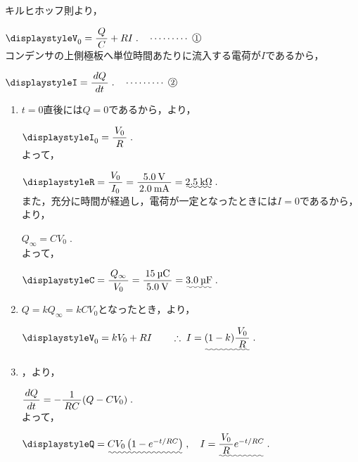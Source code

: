 \documentclass[../../../uem_phy_std_a.tex]{subfiles}
\begin{document}
    キルヒホッフ則より，
    
    \myspaceb%
    $\displaystyle%
        V_0 = \myfracc{Q}{C} + RI \;.\quad\cdots\cdots\cdots\;\mynumberb{1}
    $\\
    コンデンサの上側極板へ単位時間あたりに流入する電荷が$I$であるから，
    
    \myspaceb%
    $\displaystyle%
        I = \myfracc{dQ}{dt} \;.\quad\cdots\cdots\cdots\;\mynumberb{2}
    $
    
    \begin{enumerate}
        \item $t=0$直後には$Q=0$であるから，より，
            
            \myspaceb%
            $\displaystyle%
                I_0 = \myfracc{V_0}{R} \;.
            $\\
            よって，
            
            \myspaceb%
            $\displaystyle%
                R = \myfracc{V_0}{I_0}%
                = \myfraca{5.0\:\mathrm{V}}{2.0\:\mathrm{mA}}%
                = \uwave{2.5\:\mathrm{k}\Omega} \;.
            $\\
            また，充分に時間が経過し，電荷が一定となったときには$I=0$であるから，より，
            
            \myspaceb%
            $\displaystyle%
                Q_\infty = CV_0 \;.
            $\\
            よって，
            
            \myspaceb%
            $\displaystyle%
                C = \myfracc{Q_\infty}{V_0}%
                = \myfracc{15\:\text{\textmu C}}{5.0\:\mathrm{V}}%
                = \uwave{3.0\:\text{\textmu F}} \;.
            $
        \item $Q = kQ_\infty = kCV_0$となったとき，より，
            
            \myspaceb%
            $\displaystyle%
                V_0 = kV_0 + RI%
                \qquad \therefore \; I = \uwave{(1-k) \myfracc{V_0}{R}} \;.
            $
        \item {}，より，
            
            \myspaceb%
            $\displaystyle%
                \myfracc{dQ}{dt} = - \myfraca{1}{RC} (Q-CV_0) \;.
            $\\
            よって，
            
            \myspaceb%
            $\displaystyle%
                Q = \uwave{CV_0\left( 1 - e^{-t/RC} \right)} \;,%
                \quad I = \uwave{\myfracc{V_0}{R} e^{-t/RC}} \;.
            $
    \end{enumerate}
\end{document}
